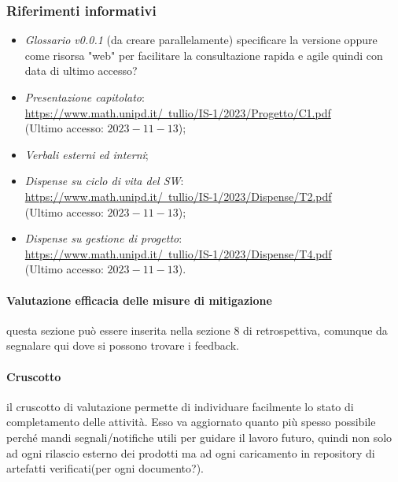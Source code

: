 \documentclass[10pt, a4paper]{article}
\begin{document}
\subsubsection{Riferimenti informativi}
\begin{itemize}
    \item \textit{Glossario v0.0.1} (da creare parallelamente) specificare la versione oppure come risorsa "web" per facilitare la consultazione rapida e agile quindi con data di ultimo accesso?
   
    \item \textit{Presentazione capitolato}:\\
    \href{https://www.math.unipd.it/~tullio/IS-1/2023/Progetto/C1.pdf}{https://www.math.unipd.it/~tullio/IS-1/2023/Progetto/C1.pdf}\\
    (Ultimo accesso: $2023-11-13$);   
    
    \item \textit{Verbali esterni ed interni};
    
    \item \textit{Dispense su ciclo di vita del SW}:\\
    \href{https://www.math.unipd.it/~tullio/IS-1/2023/Dispense/T2.pdf}{https://www.math.unipd.it/~tullio/IS-1/2023/Dispense/T2.pdf}\\
    (Ultimo accesso: $2023-11-13$);
    
    \item  \textit{Dispense su gestione di progetto}:\\
    \href{https://www.math.unipd.it/~tullio/IS-1/2023/Dispense/T4.pdf}{https://www.math.unipd.it/~tullio/IS-1/2023/Dispense/T4.pdf}\\
    (Ultimo accesso: $2023-11-13$).
\end{itemize}


   
\paragraph{Valutazione efficacia delle misure di mitigazione} questa sezione può essere inserita nella sezione 8 di retrospettiva, comunque da segnalare qui dove si possono trovare i feedback.
\paragraph{Cruscotto} il cruscotto di valutazione permette di individuare
facilmente lo stato di completamento delle attività. Esso va aggiornato quanto più spesso possibile perché mandi segnali/notifiche utili per guidare il lavoro futuro, quindi non solo ad ogni rilascio esterno dei prodotti ma ad ogni caricamento in repository di artefatti verificati(per ogni documento?).\\
\color{black}
\end{document}
